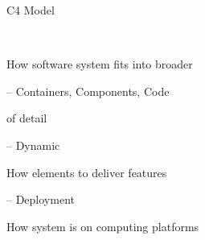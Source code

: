 \documentclass{slide}
\begin{document}
\begin{frame}{C4 Model}
\Large{
\begin{description}
    \item<1->[Context] ~~~~
    \begin{itemize}
        \large{\item[$\bullet$] How software system fits into broader }
    \end{itemize}
    \item<2->[Structure] -- Containers, Components, Code
    \begin{itemize}
        \large{\item[$\bullet$]  of detail}
    \end{itemize}
    \item<3->[Behaviour] -- Dynamic
    \begin{itemize}
        \large{\item[$\bullet$] How elements  to deliver features}
    \end{itemize}
    \item<4->[Infrastructure] -- Deployment
    \begin{itemize}
        \large{\item[$\bullet$] How system is  on computing platforms}
    \end{itemize}
\end{description}
}

\end{frame}
\end{document}
